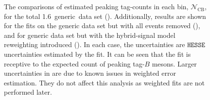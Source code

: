\begin{figure}[htbp!]
    \caption{\label{fig:mc_fit_yield_comparisons}The comparisons of estimated peaking tag-\B counts in each \EB bin, $\mathcal{N}_{\mathrm{CB}}$,
    for the total 1.6~\invab generic~\MC data set ().
    Additionally, results are shown for the fits on the generic \MC data set but with all \BtoXsgamma events removed (),
    and for generic \MC data set but with the hybrid-signal model reweighting introduced ().
    In each case, the uncertainties are $\texttt{HESSE}$ uncertainties estimated by the fit.
    It can be seen that the fit is receptive to the expected count of peaking tag-$B$ mesons.
    Larger uncertainties in  are due to known issues in weighted error estimation.
    They do not affect this analysis as weighted fits are not performed later.
    }
\end{figure}